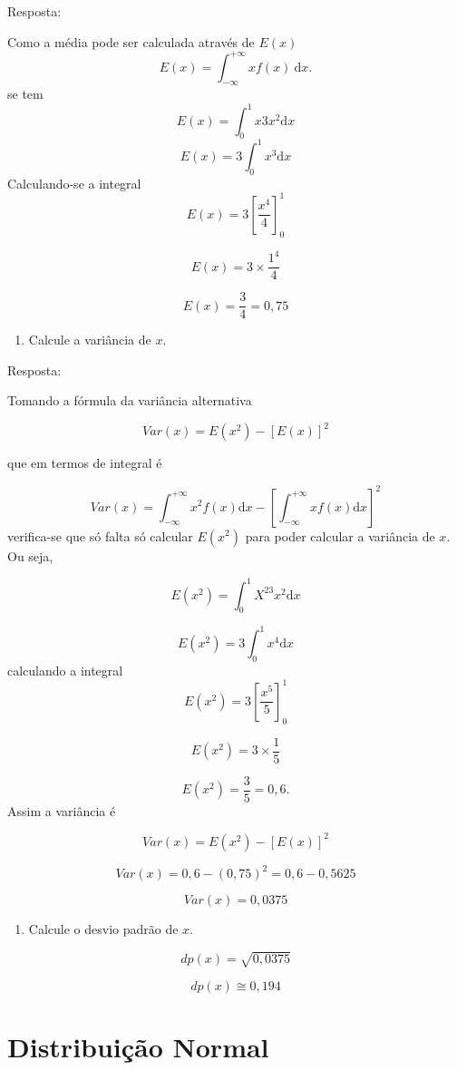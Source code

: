\documentclass[
]{book}
\providecommand{\tightlist}{%
  \setlength{\itemsep}{0pt}\setlength{\parskip}{0pt}}
\begin{document}
Resposta:

Como a média pode ser calculada através de \(E(x)\)
\[
  E(x) = \int_{-\infty}^{+\infty} x f(x)~\text{d}x.
\]
se tem
\[
  E(x) = \int_{0}^{1}x3x^2\text{d}x
\]
\[
  E(x) = 3\int_{0}^{1}x^3\text{d}x
\]
Calculando-se a integral
\[
  E(x) = 3\left[ \dfrac{x^4}{4}\right]_{0}^{1}
\]

\[
  E(x) = 3 \times \dfrac{1^4}{4}
\]

\[
  E(x) = \dfrac{3}{4} = 0,75
\]

\begin{enumerate}
\def\labelenumi{\alph{enumi})}
\setcounter{enumi}{1}
\tightlist
\item
  Calcule a variância de \(x\).
\end{enumerate}

Resposta:

Tomando a fórmula da variância alternativa

\[
  Var(x) = E(x^2) - [E(x)]^2 
\]

que em termos de integral é

\[
  Var(x) = \int_{-\infty}^{+\infty} x^2 f(x)\text{d}x -
  \left[\int_{-\infty}^{+\infty} xf(x) \text{d}x \right]^2
\]
verifica-se que só falta só calcular \(E(x^2)\) para poder calcular a variância de \(x\). Ou seja,

\[
  E(x^2) = \int_{0}^{1} X^23x^2 \text{d}x 
\]

\[
  E(x^2) = 3\int_{0}^{1} x^4  \text{d}x 
\]
calculando a integral
\[
  E(x^2) = 3\left[ \dfrac{x^5}{5} \right]_{0}^{1}
\]

\[
  E(x^2) = 3 \times \dfrac{1}{5}
\]

\[
  E(x^2) = \dfrac{3}{5} = 0,6.
\]
Assim a variância é

\[
  Var(x) = E(x^2) - [E(x)]^2
\]

\[
  Var(x) = 0,6 - (0,75)^2 = 0,6 - 0,5625
\]

\[
  Var(x) = 0,0375
\]

\begin{enumerate}
\def\labelenumi{\alph{enumi})}
\setcounter{enumi}{2}
\tightlist
\item
  Calcule o desvio padrão de \(x\).
\end{enumerate}

\[
dp(x) = \sqrt{0,0375}
\]

\[
dp(x) \cong 0,194
\]

\hypertarget{distribuiuxe7uxe3o-normal}{%
\section{Distribuição Normal}\label{distribuiuxe7uxe3o-normal}}
\end{document}
